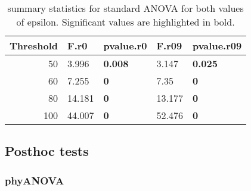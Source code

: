 \documentclass[]{article}
\begin{document}
\begin{table}[H]

\caption{\label{tab:unnamed-chunk-8}summary statistics for standard ANOVA for both values of epsilon. Significant values are highlighted in bold.}
\centering
\begin{tabular}{r|l|l|l|l}
\hline
Threshold & F.r0 & pvalue.r0 & F.r09 & pvalue.r09\\
\hline
50 & 3.996 & \textbf{0.008} & 3.147 & \textbf{0.025}\\
\hline
60 & 7.255 & \textbf{0} & 7.35 & \textbf{0}\\
\hline
80 & 14.181 & \textbf{0} & 13.177 & \textbf{0}\\
\hline
100 & 44.007 & \textbf{0} & 52.476 & \textbf{0}\\
\hline
\end{tabular}
\end{table}

\hypertarget{posthoc-tests}{%
\subsection{Posthoc tests}\label{posthoc-tests}}

\hypertarget{phyanova-1}{%
\subsubsection{phyANOVA}\label{phyanova-1}}
\end{document}

